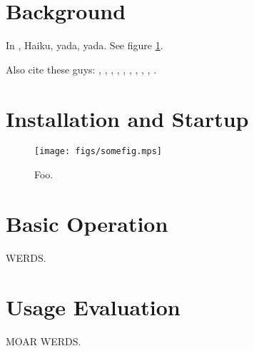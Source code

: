 \documentclass{article}
\begin{document}
\maketitle

\section{Background}

In \cite{BeosWiki}, Haiku, yada, yada.  See figure \ref{fig:foo}.

Also cite these guys: \cite{HaikuWiki}, \cite{HaikuAbout}, \cite{HaikuFaq}, \cite{HaikuHist}, \cite{HaikuContrib}, \cite{HaikuComm}, \cite{HaikuWelcome}, \cite{HaikuGuide}, \cite{HaikuHIG}, \cite{HaikuIcon}.

\section{Installation and Startup}

\begin{figure}[h]
\centering
\texttt{[image: figs/somefig.mps]}
\caption{Foo.}
\label{fig:foo}
\end{figure}

\section{Basic Operation}

WERDS.

\section{Usage Evaluation}

MOAR WERDS.

{}

\end{document}
